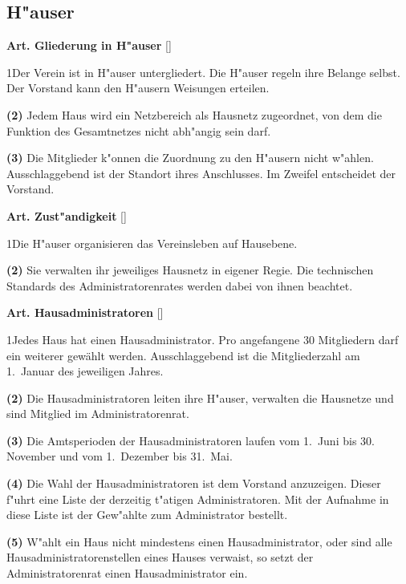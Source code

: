\documentclass[12pt]{article}
\newcommand{\UAbschnitt}[1]{\subsection{#1}}
\newcommand{\Satz}[2]{

\begin{samepage}
{\bf (#1)} #2
\end{samepage}
}
\newenvironment{Artikel}[2]{
\bigskip \centerline{{\bf Art. #1} [#2]}
\nopagebreak
}{
}
\begin{document}
\UAbschnitt{H"auser} 

\begin{Artikel}{17}{Gliederung in H"auser}

\Satz{1}{Der Verein ist in H"auser untergliedert. Die H"auser regeln ihre
Belange selbst. Der Vorstand kann den H"ausern Weisungen erteilen.}

\Satz{2}{Jedem Haus wird ein Netzbereich als Hausnetz zugeordnet, von dem 
die Funktion des Gesamtnetzes nicht abh"angig sein darf.}

\Satz{3}{Die Mitglieder k"onnen die Zuordnung zu den H"ausern nicht w"ahlen.
Ausschlaggebend ist der Standort ihres Anschlusses. Im Zweifel entscheidet der 
Vorstand.}

\end{Artikel}

\begin{Artikel}{18}{Zust"andigkeit}

\Satz{1}{Die H"auser organisieren das Vereinsleben auf Hausebene.}

\Satz{2}{Sie verwalten ihr jeweiliges Hausnetz in eigener Regie.
Die technischen Standards des Administratorenrates werden dabei von
ihnen beachtet.}

\end{Artikel}

\begin{Artikel}{19}{Hausadministratoren}

\Satz{1}{Jedes Haus hat einen Hausadministrator. Pro angefangene 30 
Mitgliedern darf ein weiterer gewählt werden. Ausschlaggebend ist die 
Mitgliederzahl am \mbox{1. Januar} des jeweiligen Jahres.}

\Satz{2}{Die Hausadministratoren leiten ihre H"auser, verwalten die
Hausnetze und sind Mitglied im Administratorenrat.}

\Satz{3}{Die Amtsperioden der Hausadministratoren laufen vom 
\mbox{1. Juni} bis 30. November und vom \mbox{1. Dezember} bis 
\mbox{31. Mai}.}

\Satz{4}{Die Wahl der Hausadministratoren ist dem Vorstand anzuzeigen.
Dieser f"uhrt eine Liste der derzeitig t"atigen Administratoren. Mit der
Aufnahme in diese Liste ist der Gew"ahlte zum Administrator bestellt.}

\Satz{5}{W"ahlt ein Haus nicht mindestens einen Hausadministrator, oder 
sind alle Hausadministratorenstellen eines Hauses verwaist, so setzt der 
Administratorenrat einen Hausadministrator ein.}

\end{Artikel}
\end{document}
